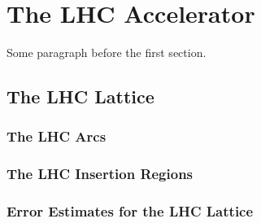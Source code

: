 
\chapter{The LHC Accelerator} %

\label{Chapter2} %




Some paragraph before the first section.




\section{The LHC Lattice}


\subsection{The LHC Arcs}

\subsection{The LHC Insertion Regions}

\subsection{Error Estimates for the LHC Lattice}

